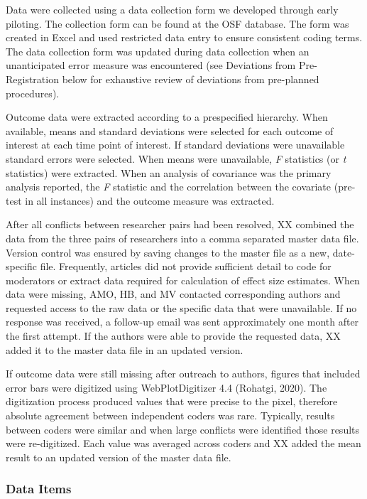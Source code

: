 \documentclass[
  english,
  man, donotrepeattitle,floatsintext]{apa7}
\begin{document}
Data were collected using a data collection form we developed through early piloting. The collection form can be found at the OSF database. The form was created in Excel and used restricted data entry to ensure consistent coding terms. The data collection form was updated during data collection when an unanticipated error measure was encountered (see Deviations from Pre-Registration below for exhaustive review of deviations from pre-planned procedures).

Outcome data were extracted according to a prespecified hierarchy. When available, means and standard deviations were selected for each outcome of interest at each time point of interest. If standard deviations were unavailable standard errors were selected. When means were unavailable, \emph{F} statistics (or \emph{t} statistics) were extracted. When an analysis of covariance was the primary analysis reported, the \emph{F} statistic and the correlation between the covariate (pre-test in all instances) and the outcome measure was extracted.

After all conflicts between researcher pairs had been resolved, XX combined the data from the three pairs of researchers into a comma separated master data file. Version control was ensured by saving changes to the master file as a new, date-specific file. Frequently, articles did not provide sufficient detail to code for moderators or extract data required for calculation of effect size estimates. When data were missing, AMO, HB, and MV contacted corresponding authors and requested access to the raw data or the specific data that were unavailable. If no response was received, a follow-up email was sent approximately one month after the first attempt. If the authors were able to provide the requested data, XX added it to the master data file in an updated version.

If outcome data were still missing after outreach to authors, figures that included error bars were digitized using WebPlotDigitizer 4.4 (Rohatgi, 2020). The digitization process produced values that were precise to the pixel, therefore absolute agreement between independent coders was rare. Typically, results between coders were similar and when large conflicts were identified those results were re-digitized. Each value was averaged across coders and XX added the mean result to an updated version of the master data file.

\hypertarget{data-items}{%
\subsubsection{Data Items}\label{data-items}}
\end{document}

